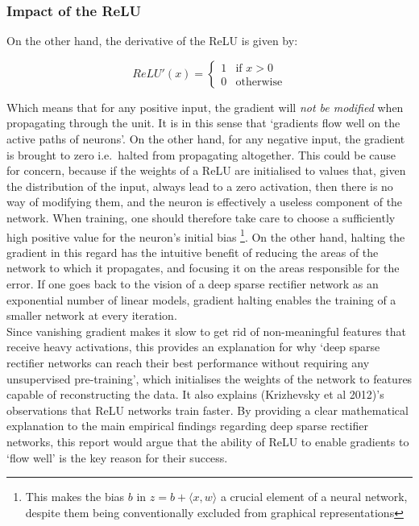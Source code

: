 \documentclass[a4paper,11pt]{article}
\begin{document}
\subsubsection{Impact of the ReLU}

On the other hand, the derivative of the ReLU is given by:

\begin{equation}
ReLU'(x) = \begin{cases} 1 & \mbox{if } x > 0\\ 
				  0 & \mbox{otherwise} \end{cases}
\end{equation} 

Which means that for any positive input, the gradient will \textit{not be modified} when propagating through the unit. It is in this sense that `gradients flow well on the active paths of neurons'. On the other hand, for any negative input, the gradient is brought to zero i.e.\ halted from propagating altogether. This could be cause for concern, because if the weights of a ReLU are initialised to values that, given the distribution of the input, always lead to a zero activation, then there is no way of modifying them, and the neuron is effectively a useless component of the network. When training, one should therefore take care to choose a sufficiently high positive value for the neuron's initial bias \footnote{This makes the bias $b$ in $z = b + \langle x, w \rangle$ a crucial element of a neural network, despite them being conventionally excluded from graphical representations}. On the other hand, halting the gradient in this regard has the intuitive benefit of reducing the areas of the network to which it propagates, and focusing it on the areas responsible for the error. If one goes back to the vision of a deep sparse rectifier network as an exponential number of linear models, gradient halting enables the training of a smaller network at every iteration. \\

Since vanishing gradient makes it slow to get rid of non-meaningful features that receive heavy activations, this provides an explanation for why `deep sparse rectifier networks can reach their best performance without requiring any unsupervised pre-training', which initialises the weights of the network to features capable of reconstructing the data. It also explains (Krizhevsky et al 2012)'s observations that ReLU networks train faster. By providing a clear mathematical explanation to the main empirical findings regarding deep sparse rectifier networks, this report would argue that the ability of ReLU to enable gradients to `flow well' is the key reason for their success. \\
\end{document}
